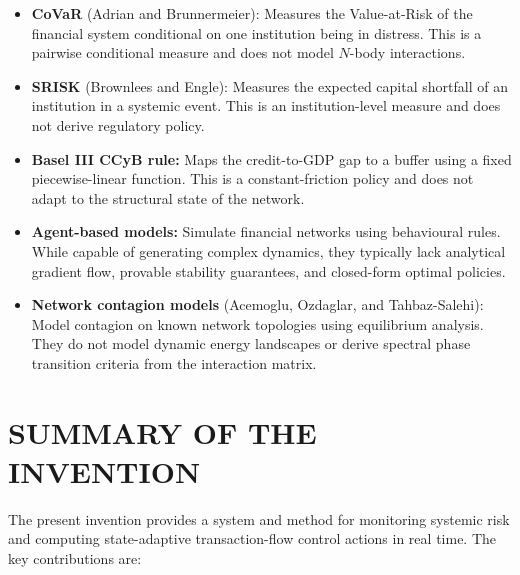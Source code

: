 \documentclass[12pt,a4paper]{article}
\begin{document}
\begin{itemize}
\item \textbf{CoVaR} (Adrian and Brunnermeier): Measures the Value-at-Risk 
of the financial system conditional on one institution being in distress. 
This is a pairwise conditional measure and does not model $N$-body 
interactions.

\item \textbf{SRISK} (Brownlees and Engle): Measures the expected capital 
shortfall of an institution in a systemic event. This is an 
institution-level measure and does not derive regulatory policy.

\item \textbf{Basel III CCyB rule:} Maps the credit-to-GDP gap to a buffer 
using a fixed piecewise-linear function. This is a constant-friction policy 
and does not adapt to the structural state of the network.

\item \textbf{Agent-based models:} Simulate financial networks using 
behavioural rules. While capable of generating complex dynamics, they 
typically lack analytical gradient flow, provable stability guarantees, 
and closed-form optimal policies.

\item \textbf{Network contagion models} (Acemoglu, Ozdaglar, and 
Tahbaz-Salehi): Model contagion on known network topologies using 
equilibrium analysis. They do not model dynamic energy landscapes or derive 
spectral phase transition criteria from the interaction matrix.
\end{itemize}

\section{SUMMARY OF THE INVENTION}

The present invention provides a system and method for monitoring systemic 
risk and computing state-adaptive transaction-flow control actions in real 
time. 
The key contributions are:
\end{document}
